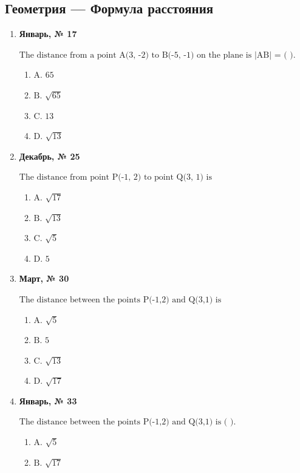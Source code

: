 \subsection*{Геометрия — Формула расстояния}
\begin{enumerate}
\item \textbf{Январь, № 17} \par \smallskip
$\displaystyle \text{The distance from a point A(3, -2) to B(-5, -1) on the plane is |AB| = ( ).}$
\begin{enumerate}
\item $\displaystyle \text{A. 65}$
\item $\displaystyle \text{B. }\sqrt{65}$
\item $\displaystyle \text{C. 13}$
\item $\displaystyle \text{D. }\sqrt{13}$
\end{enumerate}
\item \textbf{Декабрь, № 25} \par \smallskip
$\displaystyle \text{The distance from point P(-1, 2) to point Q(3, 1) is}$
\begin{enumerate}
\item $\displaystyle \text{A. }\sqrt{17}$
\item $\displaystyle \text{B. }\sqrt{13}$
\item $\displaystyle \text{C. }\sqrt{5}$
\item $\displaystyle \text{D. 5}$
\end{enumerate}
\item \textbf{Март, № 30} \par \smallskip
$\displaystyle \text{The distance between the points P(-1,2) and Q(3,1) is}$
\begin{enumerate}
\item $\displaystyle \text{A. }\sqrt{5}$
\item $\displaystyle \text{B. 5}$
\item $\displaystyle \text{C. }\sqrt{13}$
\item $\displaystyle \text{D. }\sqrt{17}$
\end{enumerate}
\item \textbf{Январь, № 33} \par \smallskip
$\displaystyle \text{The distance between the points P(-1,2) and Q(3,1) is ( ).}$
\begin{enumerate}
\item $\displaystyle \text{A. }\sqrt{5}$
\item $\displaystyle \text{B. }\sqrt{17}$

\end{enumerate}
\end{enumerate}
